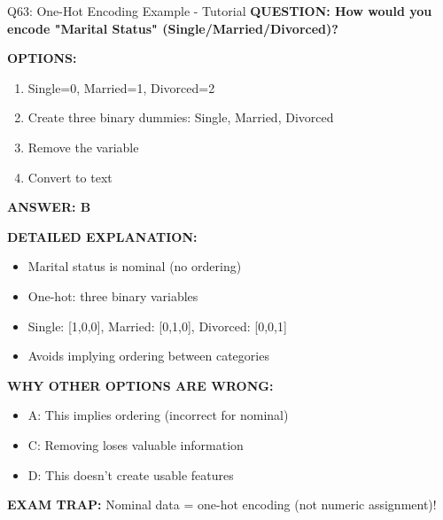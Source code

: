 \documentclass[8pt]{beamer}
\begin{document}
	\begin{frame}{Q63: One-Hot Encoding Example - Tutorial}
		\fontsize{6.5}{7.5}\selectfont
		\textbf{QUESTION: How would you encode "Marital Status" (Single/Married/Divorced)?}
		
		\vspace{0.1cm}
		\textbf{OPTIONS:}
		\begin{enumerate}
			\item Single=0, Married=1, Divorced=2
			\item Create three binary dummies: Single, Married, Divorced
			\item Remove the variable
			\item Convert to text
		\end{enumerate}
		
		\vspace{0.1cm}
		\textcolor{myblue}{\textbf{ANSWER: B}}
		
		\vspace{0.1cm}
		\textbf{DETAILED EXPLANATION:}
		\begin{itemize}
			\item Marital status is nominal (no ordering)
			\item One-hot: three binary variables
			\item Single: [1,0,0], Married: [0,1,0], Divorced: [0,0,1]
			\item Avoids implying ordering between categories
		\end{itemize}
		
		\vspace{0.1cm}
		\textcolor{myred}{\textbf{WHY OTHER OPTIONS ARE WRONG:}}
		\begin{itemize}
			\item \textcolor{myred}{A:} This implies ordering (incorrect for nominal)
			\item \textcolor{myred}{C:} Removing loses valuable information
			\item \textcolor{myred}{D:} This doesn't create usable features
		\end{itemize}
		
		\textcolor{myred}{\textbf{EXAM TRAP:}} Nominal data = \textcolor{myblue}{one-hot encoding} (not numeric assignment)!
	\end{frame}
	
\end{document}
